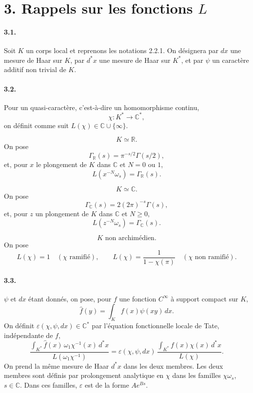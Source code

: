\documentclass[10pt]{article}
\newcommand{\C}{\mathbb C}
\providecommand{\R}{\mathbb R}
\begin{document}
\section*{3. Rappels sur les fonctions \(L\)}

\paragraph{3.1.} Soit \(K\) un corps local et reprenons les notations 2.2.1. On désignera par \(dx\) une mesure de Haar sur \(K\), par \(d^*x\) une mesure de Haar sur \(K^*\), et par \(\psi\) un caractère additif non trivial de \(K\).

\paragraph{3.2.} Pour un quasi-caractère, c'est-à-dire un homomorphisme continu,
\[
\chi:K^*\longrightarrow\C^*,
\]
on définit comme suit \(L(\chi)\in\C\cup\{\infty\}\).

\[
\tag{3.2.1}
K\simeq\R.
\]
On pose
\[
\Gamma_\R(s)=\pi^{-s/2}\Gamma(s/2),
\]
et, pour \(x\) le plongement de \(K\) dans \(\C\) et \(N=0\) ou \(1\),
\[
L(x^{-N}\omega_s)=\Gamma_\R(s).
\]

\[
\tag{3.2.2}
K\simeq\C.
\]
On pose
\[
\Gamma_\C(s)=2(2\pi)^{-s}\Gamma(s),
\]
et, pour \(z\) un plongement de \(K\) dans \(\C\) et \(N\ge0\),
\[
L(z^{-N}\omega_s)=\Gamma_\C(s).
\]

\[
\tag{3.2.3}
K\text{ non archimédien.}
\]
On pose
\[
L(\chi)=1\quad(\chi\text{ ramifié}),
\qquad
L(\chi)=\frac1{1-\chi(\pi)}\quad(\chi\text{ non ramifié}).
\]

\paragraph{3.3.} \(\psi\) et \(dx\) étant donnés, on pose, pour \(f\) une fonction \(C^\infty\) à support compact sur \(K\),
\[
\widehat f(y)=\int_K f(x)\psi(xy)\,dx.
\]
On définit \(\varepsilon(\chi,\psi,dx)\in\C^*\) par l'équation fonctionnelle locale de Tate, indépendante de \(f\),
\[
\tag{3.3.1}
\frac{\displaystyle\int_{K^*}\widehat f(x)\,\omega_1\chi^{-1}(x)\,d^*x}
     {L(\omega_1\chi^{-1})}
=
\varepsilon(\chi,\psi,dx)\,
\frac{\displaystyle\int_{K^*}f(x)\chi(x)\,d^*x}
     {L(\chi)}.
\]
On prend la même mesure de Haar \(d^*x\) dans les deux membres. Les deux membres sont définis par prolongement analytique en \(\chi\) dans les familles \(\chi\omega_s\), \(s\in\C\). Dans ces familles, \(\varepsilon\) est de la forme \(Ae^{Bs}\).
\end{document}
